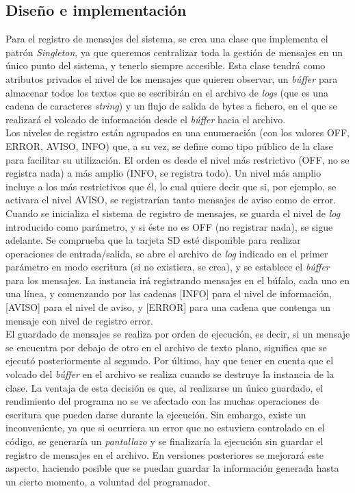 \subsection{Diseño e implementación}

Para el registro de mensajes del sistema, se crea una clase que implementa el patrón \emph{Singleton}, ya que queremos centralizar toda la gestión de mensajes en un único punto del sistema, y tenerlo siempre accesible. Esta clase tendrá como atributos privados el nivel de los mensajes que quieren observar, un \emph{búffer} para almacenar todos los textos que se escribirán en el archivo de \emph{logs} (que es una cadena de caracteres \emph{string}) y un flujo de salida de bytes a fichero, en el que se realizará el volcado de información desde el \emph{búffer} hacia el archivo.\\

Los niveles de registro están agrupados en una enumeración (con los valores OFF, ERROR, AVISO, INFO) que, a su vez, se define como tipo público de la clase para facilitar su utilización. El orden es desde el nivel más restrictivo (OFF, no se registra nada) a más amplio (INFO, se registra todo). Un nivel más amplio incluye a los más restrictivos que él, lo cual quiere decir que si, por ejemplo, se activara el nivel AVISO, se registrarían tanto mensajes de aviso como de error.\\

Cuando se inicializa el sistema de registro de mensajes, se guarda el nivel de \emph{log} introducido como parámetro, y si éste no es OFF (no registrar nada), se sigue adelante. Se comprueba que la tarjeta SD esté disponible para realizar operaciones de entrada/salida, se abre el archivo de \emph{log} indicado en el primer parámetro en modo escritura (si no existiera, se crea), y se establece el \emph{búffer} para los mensajes. La instancia irá registrando mensajes en el búfalo, cada uno en una línea, y comenzando por las cadenas [INFO] para el nivel de información, [AVISO] para el nivel de aviso, y [ERROR] para una cadena que contenga un mensaje con nivel de registro error.\\

El guardado de mensajes se realiza por orden de ejecución, es decir, si un mensaje se encuentra por debajo de otro en el archivo de texto plano, significa que se ejecutó posteriormente al segundo. Por último, hay que tener en cuenta que el volcado del \emph{búffer} en el archivo se realiza cuando se destruye la instancia de la clase. La ventaja de esta decisión es que, al realizarse un único guardado, el rendimiento del programa no se ve afectado con las muchas operaciones de escritura que pueden darse durante la ejecución. Sin embargo, existe un inconveniente, ya que si ocurriera un error que no estuviera controlado en el código, se generaría un \emph{pantallazo} y se finalizaría la ejecución sin guardar el registro de mensajes en el archivo. En versiones posteriores se mejorará este aspecto, haciendo posible que se puedan guardar la información generada hasta un cierto momento, a voluntad del programador.\\

